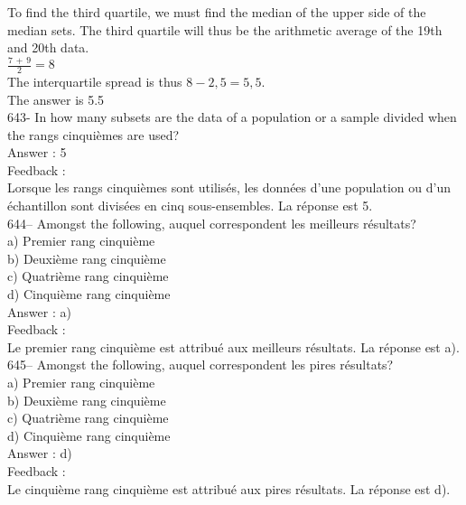 \documentclass[letterpaper, 12pt]{article}
\begin{document}
To find the third quartile, we must find the median of the upper side of the median sets. The third quartile will thus be the arithmetic average of the 19th and 20th data. \\[2mm]
$\frac{7\,+\,9}{2}=8$\\[2mm]
The interquartile spread is thus $8-2,5=5,5$.\\[2mm]
The answer is 5.5\\

643- In how many subsets are the data of a population or a sample divided when the rangs cinqui\`emes are used?\\

Answer : 5\\

Feedback : \\
Lorsque les rangs cinqui\`emes sont utilis\'es, les donn\'ees d'une
population ou d'un \'echantillon sont divis\'ees en cinq sous-ensembles.  La
r\'eponse est 5.\\

644-- Amongst the following, auquel correspondent les meilleurs
r\'esultats?\\
a) Premier rang cinqui\`eme\\
b) Deuxi\`eme rang cinqui\`eme\\
c) Quatri\`eme rang cinqui\`eme\\
d) Cinqui\`eme rang cinqui\`eme\\

Answer : a)\\

Feedback : \\
Le premier rang cinqui\`eme est attribu\'e aux meilleurs r\'esultats.  La
r\'eponse est a).\\

645-- Amongst the following, auquel correspondent les pires
r\'esultats?\\
a) Premier rang cinqui\`eme\\
b) Deuxi\`eme rang cinqui\`eme\\
c) Quatri\`eme rang cinqui\`eme\\
d) Cinqui\`eme rang cinqui\`eme\\

Answer : d)\\

Feedback : \\
Le cinqui\`eme rang cinqui\`eme est attribu\'e aux pires r\'esultats.  La
r\'eponse est d).\\
\end{document}
